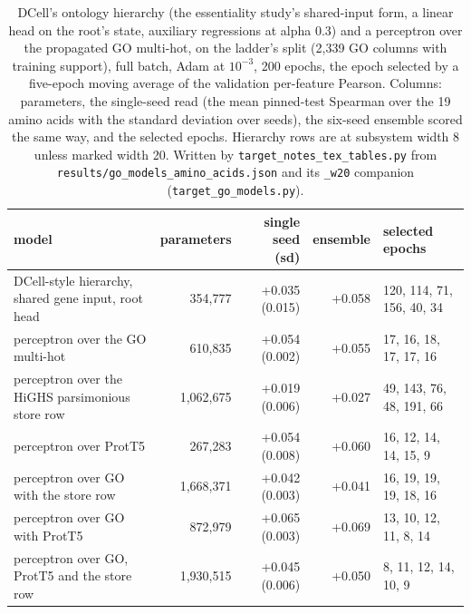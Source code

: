 \begin{table}[H]
  \centering
  \footnotesize
  \caption[The annotation-only family on amino acids]{DCell's ontology hierarchy (the essentiality study's shared-input form, a linear head on the root's state, auxiliary regressions at alpha 0.3) and a perceptron over the propagated GO multi-hot, on the ladder's split (2,339 GO columns with training support), full batch, Adam at $10^{-3}$, 200 epochs, the epoch selected by a five-epoch moving average of the validation per-feature Pearson. Columns: parameters, the single-seed read (the mean pinned-test Spearman over the 19 amino acids with the standard deviation over seeds), the six-seed ensemble scored the same way, and the selected epochs. Hierarchy rows are at subsystem width 8 unless marked width 20. Written by \texttt{target\_notes\_tex\_tables.py} from \texttt{results/go\_models\_amino\_acids.json} and its \texttt{\_w20} companion (\texttt{target\_go\_models.py}).}
  \label{tab:go-models}
  \begin{tabular}{@{}lrrrl@{}}
    \hline
    model & parameters & single seed (sd) & ensemble & selected epochs \\
    \hline
    DCell-style hierarchy, shared gene input, root head & 354,777 & +0.035 (0.015) & +0.058 & 120, 114, 71, 156, 40, 34 \\
    perceptron over the GO multi-hot & 610,835 & +0.054 (0.002) & +0.055 & 17, 16, 18, 17, 17, 16 \\
    perceptron over the HiGHS parsimonious store row & 1,062,675 & +0.019 (0.006) & +0.027 & 49, 143, 76, 48, 191, 66 \\
    perceptron over ProtT5 & 267,283 & +0.054 (0.008) & +0.060 & 16, 12, 14, 14, 15, 9 \\
    perceptron over GO with the store row & 1,668,371 & +0.042 (0.003) & +0.041 & 16, 19, 19, 19, 18, 16 \\
    perceptron over GO with ProtT5 & 872,979 & +0.065 (0.003) & +0.069 & 13, 10, 12, 11, 8, 14 \\
    perceptron over GO, ProtT5 and the store row & 1,930,515 & +0.045 (0.006) & +0.050 & 8, 11, 12, 14, 10, 9 \\
    \hline
  \end{tabular}
\end{table}
